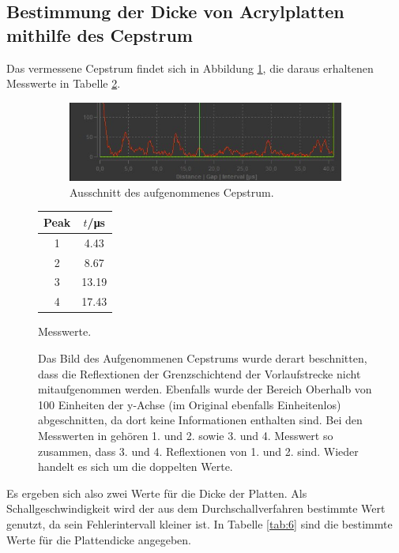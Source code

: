 \subsection{Bestimmung der Dicke von Acrylplatten mithilfe des Cepstrum}
Das vermessene Cepstrum findet sich in Abbildung \ref{abb:5}, die daraus erhaltenen
Messwerte in Tabelle \ref{tab:5}.
\begin{figure}
\begin{subfigure}{0.79\textwidth}
  \centering
  \includegraphics[width=\textwidth]{Cepstrum2.png}
  \caption{Ausschnitt des aufgenommenes Cepstrum.}
  \label{abb:5}
\end{subfigure}
\begin{subtable}{0.2\textwidth}
  \centering
  \begin{tabular}{c c }
    \toprule
    Peak & $t$/\si{\micro\second} \\
    \midrule
    1 & 4.43\\
    2 & 8.67\\
    3 & 13.19\\
    4 & 17.43\\
    \bottomrule
  \end{tabular}
  \caption{Messwerte.}
  \label{tab:5}
\end{subtable}
\caption{Das Bild des Aufgenommenen Cepstrums wurde derart beschnitten, dass die
Reflextionen der Grenzschichtend der Vorlaufstrecke nicht mitaufgenommen werden.
Ebenfalls wurde der Bereich Oberhalb von 100 Einheiten der y-Achse (im Original ebenfalls
Einheitenlos) abgeschnitten, da dort keine Informationen enthalten sind. Bei den
Messwerten in  gehören 1. und 2. sowie 3. und 4. Messwert so zusammen,
dass 3. und 4. Reflextionen von 1. und 2. sind. Wieder handelt es sich um die doppelten Werte.}
\end{figure}
Es ergeben sich also zwei Werte für die Dicke der Platten. Als Schallgeschwindigkeit wird
der aus dem Durchschallverfahren bestimmte Wert genutzt, da sein Fehlerintervall kleiner
ist. In Tabelle \ref{tab:6} sind die bestimmte Werte für die Plattendicke angegeben.
